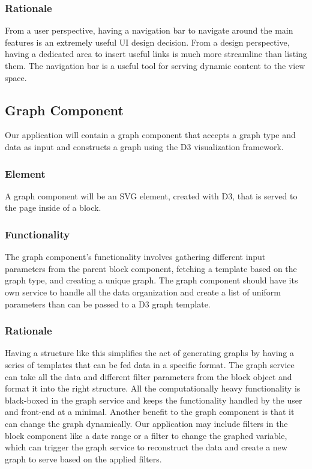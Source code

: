 \documentclass[journal,10pt,onecolumn,compsoc]{IEEEtran}
\begin{document}
	\subsubsection{Rationale}
    From a user perspective, having a navigation bar to navigate around the main features is an extremely useful UI design decision. From a design perspective, having a dedicated area to insert useful links is much more streamline than listing them. The navigation bar is a useful tool for serving dynamic content to the view space.

    \subsection{Graph Component}
    Our application will contain a graph component that accepts a graph type and data as input and constructs a graph using the D3 visualization framework.
    \subsubsection{Element}
    A graph component will be an SVG element, created with D3, that is served to the page inside of a block. 
    \subsubsection{Functionality}
    The graph component's functionality involves gathering different input parameters from the parent block component, fetching a template based on the graph type, and creating a unique graph. The graph component should have its own service to handle all the data organization and create a list of uniform parameters than can be passed to a D3 graph template.
    \subsubsection{Rationale}
    Having a structure like this simplifies the act of generating graphs by having a series of templates that can be fed data in a specific format. The graph service can take all the data and different filter parameters from the block object and format it into the right structure. All the computationally heavy functionality is black-boxed in the graph service and keeps the functionality handled by the user and front-end at a minimal. Another benefit to the graph component is that it can change the graph dynamically. Our application may include filters in the block component like a date range or a filter to change the graphed variable, which can trigger the graph service to reconstruct the data and create a new graph to serve based on the applied filters.
    
\end{document}
